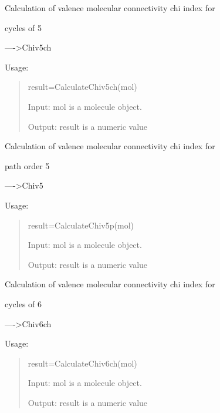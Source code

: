 \documentclass[letterpaper,10pt,english]{sphinxmanual}
\begin{document}

\begin{fulllineitems}
\label{reference/connectivity:connectivity.CalculateChiv5ch}
Calculation of valence molecular connectivity chi index for

cycles of 5

----\textgreater{}Chiv5ch

Usage:
\begin{quote}

result=CalculateChiv5ch(mol)

Input: mol is a molecule object.

Output: result is a numeric value
\end{quote}

\end{fulllineitems}


\begin{fulllineitems}
\label{reference/connectivity:connectivity.CalculateChiv5p}
Calculation of valence molecular connectivity chi index for

path order 5

----\textgreater{}Chiv5

Usage:
\begin{quote}

result=CalculateChiv5p(mol)

Input: mol is a molecule object.

Output: result is a numeric value
\end{quote}

\end{fulllineitems}


\begin{fulllineitems}
\label{reference/connectivity:connectivity.CalculateChiv6ch}
Calculation of valence molecular connectivity chi index for

cycles of 6

----\textgreater{}Chiv6ch

Usage:
\begin{quote}

result=CalculateChiv6ch(mol)

Input: mol is a molecule object.

Output: result is a numeric value
\end{quote}

\end{fulllineitems}
\end{document}
